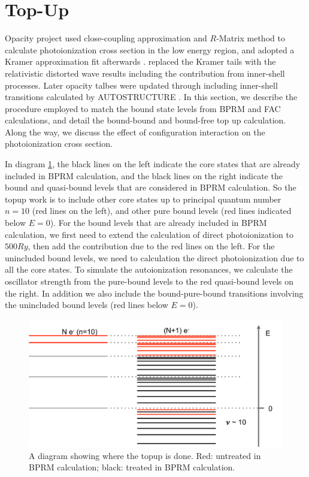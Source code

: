 \section{Top-Up}
Opacity project \citep{opcd_1, opcd_2} used close-coupling approximation and $R$-Matrix method to calculate photoionization cross section in the low energy region, and adopted a Kramer approximation fit afterwards \citep{opcd_7}. \citet{zhang_1998} replaced the Kramer tails with the relativistic distorted wave results including the contribution from inner-shell processes. Later opacity talbes were updated through including inner-shell transitions calculated by AUTOSTRUCTURE \citep{config_2003, config_2005}. In this section, we describe the procedure employed to match the bound state levels from BPRM and FAC calculations, and detail the bound-bound and bound-free top up calculation. Along the way, we discuss the effect of configuration interaction on the photoionization cross section. 

In diagram \ref{figure_topup_graph}, the black lines on the left indicate the core states that are already included in BPRM calculation, and the black lines on the right indicate the bound and quasi-bound levels that are considered in BPRM calculation. So the topup work is to include other core states up to principal quantum number $n=10$ (red lines on the left), and other pure bound levels (red lines indicated below $E=0$). For the bound levels that are already included in BPRM calculation, we first need to extend the calculation of direct photoionization to $500Ry$, then add the contribution due to the red lines on the left. For the unincluded bound levels, we need to calculation the direct photoionization due to all the core states. To simulate the autoionization resonances, we calculate the oscillator strength from the pure-bound levels to the red quasi-bound levels on the right. In addition we also include the bound-pure-bound transitions involving the unincluded bound levels (red lines below  $E=0$).
\begin{figure}
	\centering
	\includegraphics[width=.9\textwidth]{figures/topup_graph}	
	\caption{A diagram showing where the topup is done. Red: untreated in BPRM calculation; black: treated in BPRM calculation.}
	\label{figure_topup_graph}
\end{figure}

